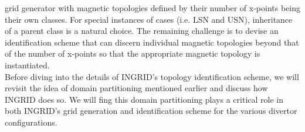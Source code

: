 grid generator with magnetic topologies defined by their number of
x-points being their own classes. For special instances of cases
(i.e. LSN and USN), inheritance of a parent class is a natural
choice. The remaining challenge is to devise an identification scheme
that can discern individual magnetic topologies beyond that of the
number of x-points so that the appropriate magnetic topology is
instantiated.\\
%
\indent Before diving into the details of INGRID's topology
identification scheme, we will revisit the idea of domain partitioning
mentioned earlier and discuss how INGRID does so. We will fing this
domain partitioning plays a critical role in both INGRID's grid
generation and identification scheme for the various divertor
configurations.


